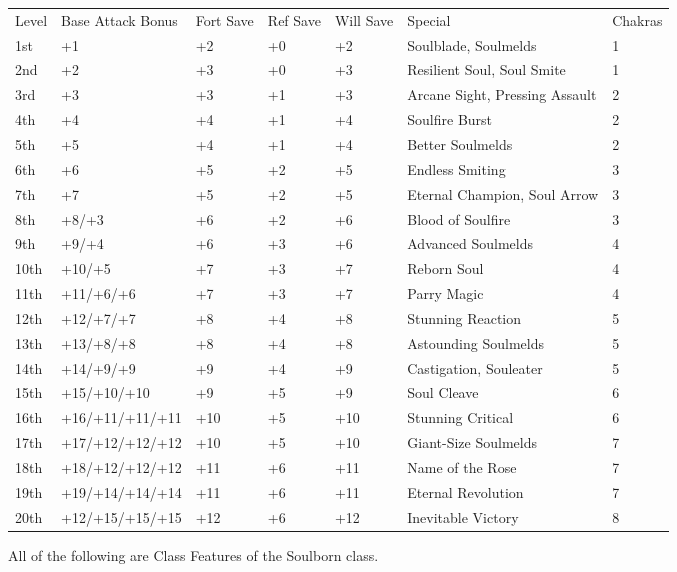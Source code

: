 \begin{table}[htb]
\begin{small}
\begin{tabular}{lp{3cm}p{0.7cm}p{0.7cm}p{0.7cm}p{6cm}l}
Level &Base Attack Bonus &Fort Save &Ref Save &Will Save &Special&Chakras\\
1st &+1 &+2 &+0 &+2 &Soulblade, Soulmelds&1\\
2nd &+2 &+3 &+0 &+3 &Resilient Soul, Soul Smite&1\\
3rd &+3 &+3 &+1 &+3 &Arcane Sight, Pressing Assault&2\\
4th &+4 &+4 &+1 &+4 &Soulfire Burst&2\\
5th &+5 &+4 &+1 &+4 &Better Soulmelds&2\\
6th &+6 &+5 &+2 &+5 &Endless Smiting&3\\
7th &+7 &+5 &+2 &+5 &Eternal Champion, Soul Arrow&3\\
8th &+8/+3 &+6 &+2 &+6 &Blood of Soulfire&3\\
9th &+9/+4 &+6 &+3 &+6 &Advanced Soulmelds&4\\
10th &+10/+5 &+7 &+3 &+7 &Reborn Soul&4\\
11th &+11/+6/+6 &+7 &+3 &+7 &Parry Magic&4\\
12th &+12/+7/+7 &+8 &+4 &+8 &Stunning Reaction&5\\
13th &+13/+8/+8 &+8 &+4 &+8 &Astounding Soulmelds&5\\
14th &+14/+9/+9 &+9 &+4 &+9 &Castigation, Souleater&5\\
15th &+15/+10/+10 &+9 &+5 &+9 &Soul Cleave&6\\
16th &+16/+11/+11/+11 &+10 &+5 &+10 &Stunning Critical&6\\
17th &+17/+12/+12/+12 &+10 &+5 &+10 &Giant-Size Soulmelds&7\\
18th &+18/+12/+12/+12 &+11 &+6 &+11 &Name of the Rose&7\\
19th &+19/+14/+14/+14 &+11 &+6 &+11 &Eternal Revolution&7\\
20th &+12/+15/+15/+15 &+12 &+6 &+12 &Inevitable Victory&8\\
\end{tabular}
\end{small}
\end{table}

\smallskip\noindent All of the following are Class Features of the Soulborn class.


